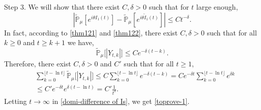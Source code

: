\documentclass[12pt,a4paper]{amsart}
\theoremstyle{plain}
\theoremstyle{definition}
\numberwithin{equation}{section}
\begin{document}
    Step 3. We will show that there exist $C, \delta> 0$ such that for $t$ large enough,
\begin{equation}\label{domi-difference of Is}
    |\mathbb{\tilde{P}}_{\mu}[e^{i\theta I_1(t)}] - \mathbb{\tilde{P}}_{\mu}[e^{i\theta\tilde{I}_1(t)}]|
    \leq C t^{-\delta}.
\end{equation}
    In fact, according to \eqref{thm121} and \eqref{thm122}, there exist $C,\delta > 0$ such that
    for all $k \geq 0$ and $t\geq k+1$ we have,
\[
    \tilde{\mathbb P}_\mu\big[|Y_{t,k}|\big]
    \leq C e^{-\delta(t-k)}.
\]
    Therefore, there exist $C, \delta > 0$ and $C'$ such that for all $t \geq 1$,
\begin{equation}\begin{split}
    &\sum_{k=0}^{\lfloor t-\ln t \rfloor} \tilde {\mathbb P}_\mu\big[|Y_{t,k}|\big]
    \leq C\sum_{k=0}^{\lfloor t-\ln t \rfloor} e^{-\delta(t-k)}
    = C e^{-\delta t}\sum_{k=0}^{\lfloor t-\ln t \rfloor} e^{\delta k}
    \\&\leq C' e^{-\delta t}e^{\delta (t-\ln t)}
    = C'\frac{1}{t^{\delta}}.
\end{split}\end{equation}
    Letting $t\to\infty$ in \eqref{domi-difference of Is}, we get \eqref{toprove-1}.
\end{document}
